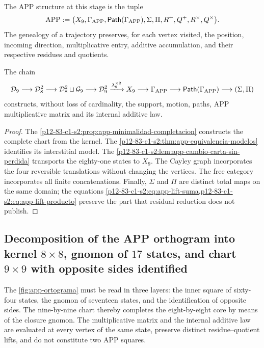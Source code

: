 \begin{definition}
\label{p12-83-c1-s2:def:app-genealogica-autonoma}
The APP structure at this stage is the tuple
\[
 \operatorname{APP}:=
 \bigl(
  X_9,
  \Gamma_{\rm APP},
  \mathsf{Path}(\Gamma_{\rm APP}),
  \Sigma,\Pi,
  R^+,Q^+,R^\times,Q^\times
 \bigr).
\]
The genealogy of a trajectory preserves, for each vertex visited, the
position, incoming direction, multiplicative entry, additive accumulation,
and their respective residues and quotients.
\end{definition}

\begin{theorem}
\label{p12-83-c1-s2:thm:app-cadena-constructiva-autonoma}
The chain
\[
 \mathcal D_9
 \longrightarrow
 \mathcal D_8^2
 \longrightarrow
 \mathcal D_8^2\sqcup\mathcal G_9
 \longrightarrow
 \mathcal D_9^2
 \xrightarrow{\lambda_9^{\times2}}
 X_9
 \longrightarrow
 \Gamma_{\rm APP}
 \longrightarrow
 \mathsf{Path}(\Gamma_{\rm APP})
 \longrightarrow
 (\Sigma,\Pi)
\]
constructs, without loss of cardinality, the support, motion, paths, APP multiplicative matrix and its internal additive law.
\end{theorem}

\begin{proof}
The \cref{p12-83-c1-s2:prop:app-minimalidad-completacion} constructs the complete chart from
the kernel. The \cref{p12-83-c1-s2:thm:app-equivalencia-modelos} identifies its
interstitial model. The \cref{p12-83-c1-s2:lem:app-cambio-carta-sin-perdida} transports
the eighty-one states to \(X_9\). The Cayley graph incorporates the four
reversible translations without changing the vertices. The free category
incorporates all finite concatenations. Finally, \(\Sigma\) and
\(\Pi\) are distinct total maps on the same domain; the
equations \cref{p12-83-c1-s2:eq:app-lift-suma,p12-83-c1-s2:eq:app-lift-producto} preserve the part
that residual reduction does not publish.
\end{proof}

\subsection{Decomposition of the APP orthogram into kernel \(8\times8\), gnomon of \(17\) states, and chart \(9\times9\) with opposite sides identified}

The \cref{fig:app-ortograma} must be read in three layers: the inner square
of sixty-four states, the gnomon of seventeen states, and the
identification of opposite sides. The nine-by-nine chart thereby completes the
eight-by-eight core by means of the closure gnomon. The multiplicative
matrix and the internal additive law are evaluated at every vertex of the same
state, preserve distinct residue--quotient lifts, and do not constitute
two APP squares.

